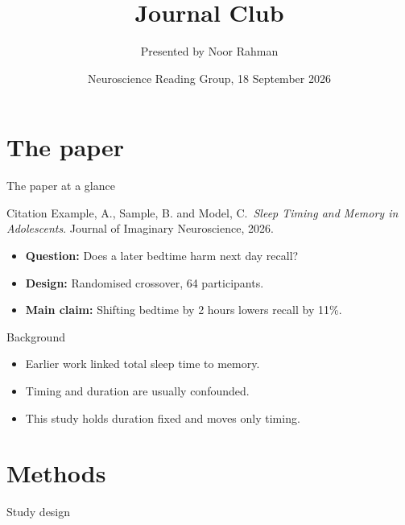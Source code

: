 \documentclass{beamer}
\title{Journal Club}
\subtitle{\papertitle}
\author[N. Rahman]{Presented by Noor Rahman}
\date{Neuroscience Reading Group, 18 September 2026}
\newcommand{\papertitle}{Sleep Timing and Memory in Adolescents}
\newcommand{\paperauthors}{Example, A., Sample, B. and Model, C.}
\newcommand{\papervenue}{Journal of Imaginary Neuroscience, 2026}
\begin{document}
\begin{frame}
  \titlepage
\end{frame}

\section{The paper}
\begin{frame}{The paper at a glance}
  \begin{block}{Citation}
    \paperauthors\ \emph{\papertitle}. \papervenue.
  \end{block}
  \begin{itemize}
    \item \textbf{Question:} Does a later bedtime harm next day recall?
    \item \textbf{Design:} Randomised crossover, 64 participants.
    \item \textbf{Main claim:} Shifting bedtime by 2 hours lowers recall by 11\%.
  \end{itemize}
\end{frame}

\begin{frame}{Background}
  \begin{itemize}
    \item Earlier work linked total sleep time to memory.
    \item Timing and duration are usually confounded.
    \item This study holds duration fixed and moves only timing.
  \end{itemize}
\end{frame}

\section{Methods}
\begin{frame}{Study design}
  \centering
\end{frame}
\end{document}
